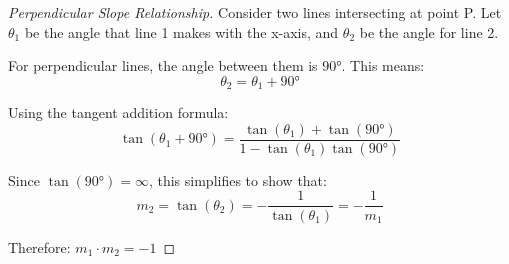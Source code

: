 \documentclass[12pt,a4paper]{article}
\theoremstyle{directpoint}
\theoremstyle{definition}
\begin{document}
\begin{center}
\end{center}

\begin{proof}[Perpendicular Slope Relationship]
Consider two lines intersecting at point P. Let $\theta_1$ be the angle that line 1 makes with the x-axis, and $\theta_2$ be the angle for line 2.

For perpendicular lines, the angle between them is $90°$. This means:
\begin{equation}
\theta_2 = \theta_1 + 90°
\end{equation}

Using the tangent addition formula:
\begin{equation}
\tan(\theta_1 + 90°) = \frac{\tan(\theta_1) + \tan(90°)}{1 - \tan(\theta_1)\tan(90°)}
\end{equation}

Since $\tan(90°) = \infty$, this simplifies to show that:
\begin{equation}
m_2 = \tan(\theta_2) = -\frac{1}{\tan(\theta_1)} = -\frac{1}{m_1}
\end{equation}

Therefore: $m_1 \cdot m_2 = -1$
\end{proof}

\newpage
\end{document}
